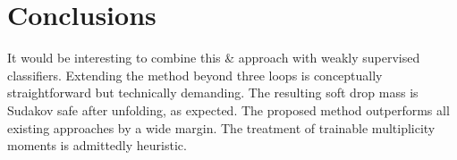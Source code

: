 \section{Conclusions}\label{sec:conclusions}

It would be interesting to combine this & approach with weakly supervised
classifiers. Extending the method beyond three loops is conceptually
straightforward but technically demanding. The resulting soft drop mass
is Sudakov safe after unfolding, as expected. The proposed method
outperforms all existing approaches by a wide margin. The treatment of
trainable multiplicity moments is admittedly heuristic.

